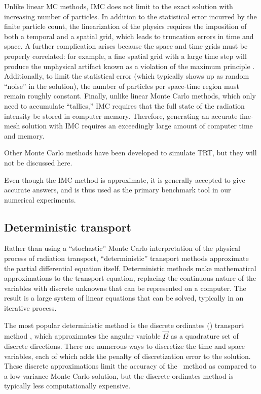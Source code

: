 Unlike linear MC methods, IMC does not limit to the exact solution with
increasing number of particles. In addition to the statistical error incurred
by the finite particle count, the linearization of the physics requires
the imposition of both a temporal and a spatial grid, which leads to
truncation errors in time and space. A further complication 
arises because the space and time grids must be properly correlated: for
example, a fine spatial grid with a large time step will produce the unphysical
artifact known as a violation of the maximum principle \cite{Lar1987}.
Additionally, to limit the statistical error (which typically shows up as
random ``noise'' in the solution), the number of particles per
space-time region must remain roughly constant. Finally, unlike linear Monte
Carlo methods, which only need to accumulate ``tallies,'' IMC requires
that the full state of the radiation intensity be stored in computer memory.
Therefore, generating an accurate fine-mesh solution with IMC requires an
exceedingly large
amount of computer time and memory.

Other Monte Carlo methods \cite{Bro1989,NKa1991,Cha2007a,
Den2004}
have been developed to simulate TRT, but they will not be discussed here.

Even though the IMC method is approximate, it is generally accepted to give
accurate answers, and is thus used as the primary benchmark tool in
our numerical experiments. 

\subsection{Deterministic transport}
Rather than using a ``stochastic'' Monte Carlo interpretation of the physical
process of radiation transport, ``deterministic'' transport methods
approximate the partial differential equation
itself. Deterministic methods make mathematical approximations to the transport
equation, replacing the continuous nature of the variables with discrete
unknowns that can be represented on a computer. The result is a large system of
linear equations that can be solved, typically in an iterative process.

The most popular deterministic method is the discrete ordinates (\SN)
transport method \cite{Lar2010}, which approximates the angular variable
$\vec{\Omega}$ as a quadrature set of discrete directions. There are numerous
ways to discretize the time and space variables, each of which adds the penalty
of discretization error to the solution. These discrete approximations limit the
accuracy of the \SN\ method as compared to a low-variance Monte Carlo solution,
but the discrete ordinates method is typically less computationally expensive.

